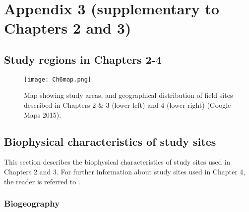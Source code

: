 \chapter[Appendix 3]{Appendix 3 (supplementary to Chapters 2 and 3)}

\section{Study regions in Chapters 2-4}

\begin{figure}[ht]
\begin{center}
\texttt{[image: Ch6map.png]} %
\caption[Map of study areas described in Chapters 2-4.]{\small{Map showing study areas, and geographical distribution of field sites described in Chapters 2 \& 3 (lower left) and 4 (lower right) (Google Maps 2015).}\label{fig:Ch6_F1}}
\end{center}
\end{figure}   
\clearpage

\section{Biophysical characteristics of study sites}

This section describes the biophysical characteristics of study sites used in Chapters 2 and 3. For further information about study sites used in Chapter 4, the reader is referred to \citep{Arthington2012}.

\subsection{Biogeography}


